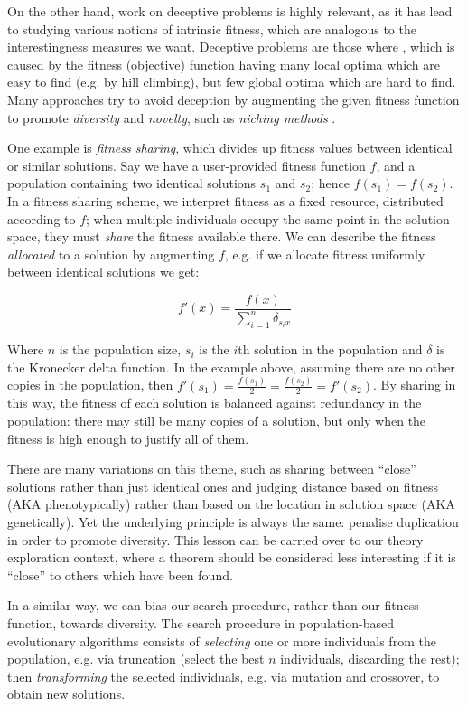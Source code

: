 On the other hand, work on deceptive problems is highly relevant, as it has lead to studying various notions of intrinsic fitness, which are analogous to the interestingness measures we want. Deceptive problems are those where  \citep{lehman2011abandoning}, which is caused by the fitness (objective) function having many local optima which are easy to find (e.g. by hill climbing), but few global optima which are hard to find. Many approaches try to avoid deception by augmenting the given fitness function to promote \emph{diversity} and \emph{novelty}, such as \emph{niching methods} \citep{sareni1998fitness}.

One example is \emph{fitness sharing}, which divides up fitness values between identical or similar solutions. Say we have a user-provided fitness function $f$, and a population containing two identical solutions $s_1$ and $s_2$; hence $f(s_1) = f(s_2)$. In a fitness sharing scheme, we interpret fitness as a fixed resource, distributed according to $f$; when multiple individuals occupy the same point in the solution space, they must \emph{share} the fitness available there. We can describe the fitness \emph{allocated} to a solution by augmenting $f$, e.g. if we allocate fitness uniformly between identical solutions we get:

$$f'(x) = \frac{f(x)}{\sum_{i=1}^n \delta_{s_i x}}$$

Where $n$ is the population size, $s_i$ is the $i$th solution in the population and $\delta$ is the Kronecker delta function. In the example above, assuming there are no other copies in the population, then $f'(s_1) = \frac{f(s_1)}{2} = \frac{f(s_2)}{2} = f'(s_2)$. By sharing in this way, the fitness of each solution is balanced against redundancy in the population: there may still be many copies of a solution, but only when the fitness is high enough to justify all of them.

There are many variations on this theme, such as sharing between ``close'' solutions rather than just identical ones and judging distance based on fitness (AKA phenotypically) rather than based on the location in solution space (AKA genetically). Yet the underlying principle is always the same: penalise duplication in order to promote diversity. This lesson can be carried over to our theory exploration context, where a theorem should be considered less interesting if it is ``close'' to others which have been found.

In a similar way, we can bias our search procedure, rather than our fitness function, towards diversity. The search procedure in population-based evolutionary algorithms consists of \emph{selecting} one or more individuals from the population, e.g. via truncation (select the best $n$ individuals, discarding the rest); then \emph{transforming} the selected individuals, e.g. via mutation and crossover, to obtain new solutions.

